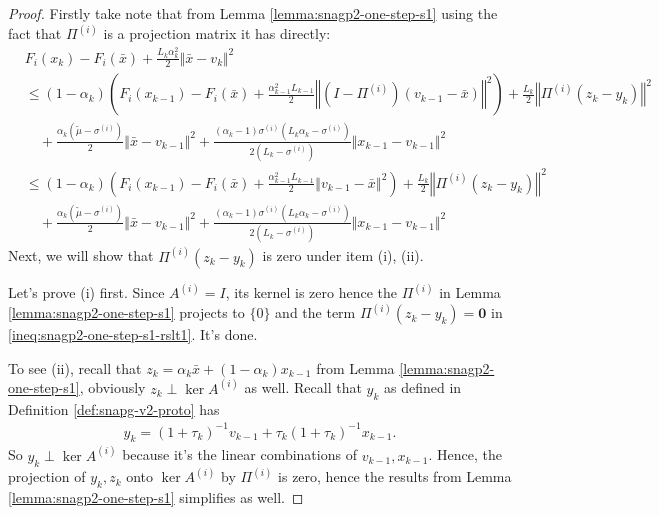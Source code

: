 \documentclass[12pt]{article}
\begin{document}
    \begin{proof}
        Firstly take note that from Lemma \ref{lemma:snagp2-one-step-s1} using the fact that $\Pi^{(i)}$ is a projection matrix it has directly: 
        \begin{align*}
            & F_i(x_{k}) - F_i(\bar x) + \frac{L_k\alpha_k^2}{2}\Vert \bar x - v_k\Vert^2 
            \\
            &\le 
            (1 - \alpha_k)\left(
                F_i(x_{k - 1}) - F_i(\bar x) + \frac{\alpha_{k - 1}^2L_{k - 1}}{2}\left\Vert (I - \Pi^{(i)})( v_{k - 1} - \bar x)\right\Vert^2
            \right)     
            + \frac{L_k}{2}\left\Vert \Pi^{(i)}(z_k - y_k)\right\Vert^2
                \\ &\quad 
                + \frac{\alpha_k(\tilde\mu - \sigma^{(i)})}{2}\Vert \bar x - v_{k - 1}\Vert^2
                + \frac{(\alpha_k - 1)\sigma^{(i)}\left(L_k\alpha_k - \sigma^{(i)}\right)}{2\left(L_k - \sigma^{(i)}\right)}\Vert x_{k - 1} - v_{k - 1} \Vert^2
            \\
            &\le 
            (1 - \alpha_k)\left(
                F_i(x_{k - 1}) - F_i(\bar x) + \frac{\alpha_{k - 1}^2L_{k - 1}}{2}\left\Vert v_{k - 1} - \bar x\right\Vert^2
            \right)     
            + \frac{L_k}{2}\left\Vert \Pi^{(i)}(z_k - y_k)\right\Vert^2
                \\ &\quad 
                + \frac{\alpha_k(\tilde\mu - \sigma^{(i)})}{2}\Vert \bar x - v_{k - 1}\Vert^2
                + \frac{(\alpha_k - 1)\sigma^{(i)}\left(L_k\alpha_k - \sigma^{(i)}\right)}{2\left(L_k - \sigma^{(i)}\right)}\Vert x_{k - 1} - v_{k - 1} \Vert^2
        \end{align*}
        Next, we will show that $\Pi^{(i)}(z_k - y_k)$ is zero under item (i), (ii). 
        \par
        Let's prove (i) first. 
        Since $A^{(i)} = I$, its kernel is zero hence the $\Pi^{(i)}$ in Lemma \ref{lemma:snagp2-one-step-s1} projects to $\{0\}$ and the term $\Pi^{(i)}(z_k - y_k) = \mathbf 0$ in \eqref{ineq:snagp2-one-step-s1-rslt1}. It's done. 
        \par
        To see (ii), recall that $z_k = \alpha_k \bar x + (1 - \alpha_k) x_{k - 1}$ from Lemma \ref{lemma:snagp2-one-step-s1}, obviously $z_k \perp \ker A^{(i)}$ as well. 
        Recall that $y_k$ as defined in Definition \ref{def:snapg-v2-proto} has
        \begin{align*}
            y_k = (1 + \tau_k)^{-1}v_{k - 1} + \tau_k(1 + \tau_k)^{-1}x_{k - 1}.
        \end{align*}
        So $y_k \perp \ker A^{(i)}$ because it's the linear combinations of $v_{k - 1}, x_{k - 1}$. 
        Hence, the projection of $y_k, z_k$ onto $\ker A^{(i)}$ by $\Pi^{(i)}$ is zero, hence the results from Lemma \ref{lemma:snagp2-one-step-s1} simplifies as well. 
    \end{proof}
\end{document}
